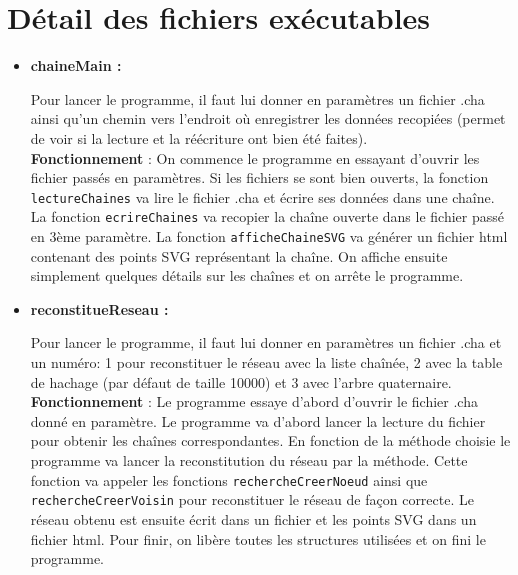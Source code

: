 \documentclass[12pt]{extarticle}
\begin{document}
\section*{Détail des fichiers exécutables}
\begin{itemize}[label=-]
    \item \textbf{chaineMain :} \\
    Pour lancer le programme, il faut lui donner en paramètres un fichier .cha ainsi qu'un chemin vers l'endroit où enregistrer les données recopiées (permet de voir si la lecture et la réécriture ont bien été faites). \\
    \textbf{Fonctionnement} : On commence le programme en essayant d'ouvrir les fichier passés en paramètres. Si les fichiers se sont bien ouverts, la fonction \texttt{lectureChaines} va lire le fichier .cha et écrire ses données dans une chaîne. La fonction \texttt{ecrireChaines} va recopier la chaîne ouverte dans le fichier passé en 3ème paramètre. La fonction \texttt{afficheChaineSVG} va générer un fichier html contenant des points SVG représentant la chaîne. On affiche ensuite simplement quelques détails sur les chaînes et on arrête le programme.
    \\
    \item \textbf{reconstitueReseau :} \\
    Pour lancer le programme, il faut lui donner en paramètres un fichier .cha et un numéro: 1 pour reconstituer le réseau avec la liste chaînée, 2 avec la table de hachage (par défaut de taille 10000) et 3 avec l'arbre quaternaire. \\
    \textbf{Fonctionnement} : Le programme essaye d'abord d'ouvrir le fichier .cha donné en paramètre. Le programme va d'abord lancer la lecture du fichier pour obtenir les chaînes correspondantes. En fonction de la méthode choisie le programme va lancer la reconstitution du réseau par la méthode. Cette fonction va appeler les fonctions \texttt{rechercheCreerNoeud} ainsi que \texttt{rechercheCreerVoisin} pour reconstituer le réseau de façon correcte. Le réseau obtenu est ensuite écrit dans un fichier et les points SVG dans un fichier html.
    Pour finir, on libère toutes les structures utilisées et on fini le programme.
    \\


\end{itemize}
\end{document}

